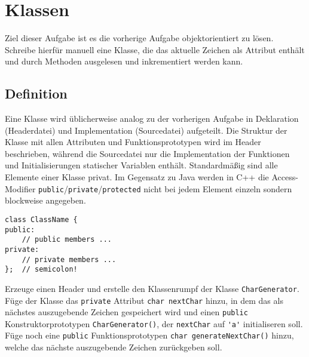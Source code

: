 \section{Klassen}
Ziel dieser Aufgabe ist es die vorherige Aufgabe objektorientiert zu lösen. Schreibe hierfür manuell eine Klasse, die das aktuelle Zeichen als Attribut enthält und durch Methoden ausgelesen und inkrementiert werden kann.


\subsection{Definition}
Eine Klasse wird üblicherweise analog zu der vorherigen Aufgabe in Deklaration (Headerdatei) und Implementation (Sourcedatei) aufgeteilt.
Die Struktur der Klasse mit allen Attributen und Funktionsprototypen wird im Header beschrieben, während die Sourcedatei nur die Implementation der Funktionen und Initialisierungen statischer Variablen enthält.
Standardmäßig sind alle Elemente einer Klasse privat.
Im Gegensatz zu Java werden in C++ die Access-Modifier \lstinline{public}/\lstinline{private}/\lstinline{protected} nicht bei jedem Element einzeln sondern blockweise angegeben.

\begin{lstlisting}
class ClassName {
public:
	// public members ...
private:
	// private members ...
};	// semicolon!
\end{lstlisting}

Erzeuge einen Header  und erstelle den Klassenrumpf der Klasse \lstinline{CharGenerator}.
Füge der Klasse das \lstinline{private} Attribut \lstinline{char nextChar} hinzu, in dem das als nächstes auszugebende Zeichen gespeichert wird und einen \lstinline{public} Konstruktorprototypen \lstinline{CharGenerator()}, der \lstinline{nextChar} auf \lstinline{'a'} initialiseren soll.
Füge noch eine \lstinline{public} Funktionsprototypen \lstinline{char generateNextChar()} hinzu, welche das nächste auszugebende Zeichen zurückgeben soll.



